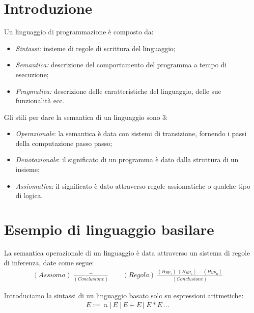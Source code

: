 \documentclass[a4paper, 11pt]{article}
\begin{document}
	\begin{frontespizio}
		\Preambolo{\usepackage{datetime}}
		\Scuola{}
	\end{frontespizio}
	
	\tableofcontents
	\newpage
	\pagestyle{fancy}
	
	\section{Introduzione}
	Un linguaggio di programmazione è composto da: \begin{itemize}
		\item \textit{Sintassi:} insieme di regole di scrittura del linguaggio;
		\item \textit{Semantica:} descrizione del comportamento del programma a tempo di esecuzione;
		\item \textit{Pragmatica:} descrizione delle caratteristiche del linguaggio, delle sue funzionalità ecc.
	\end{itemize}

	Gli stili per dare la semantica di un linguaggio sono 3:
	\begin{itemize}
		\item \textit{Operazionale}: la semantica è data con sistemi di transizione, fornendo i passi della computazione passo passo;
		\item \textit{Denotazionale}: il significato di un programma è dato dalla struttura di un insieme;
		\item \textit{Assiomatica}: il significato è dato attraverso regole assiomatiche o qualche tipo di logica.
	\end{itemize}

	\section{Esempio di linguaggio basilare}
	La semantica operazionale di un linguaggio è data attraverso un sistema di regole di inferenza, date come segue: \begin{align*}
	(Assioma)\ \frac{-}{(Conclusione)} \qquad (Regola)\ \frac{(Hyp_1)\ (Hyp_2)\ ...\ (Hyp_n)}{(Conclusione)}
	\end{align*}  
	
	Introduciamo la sintassi di un linguaggio basato solo su espressioni aritmetiche:
	\begin{align*}
		E :=\ n\ |\ E\ |\ E+E\ |\ E*E\ ...
	\end{align*}
	
\end{document}

